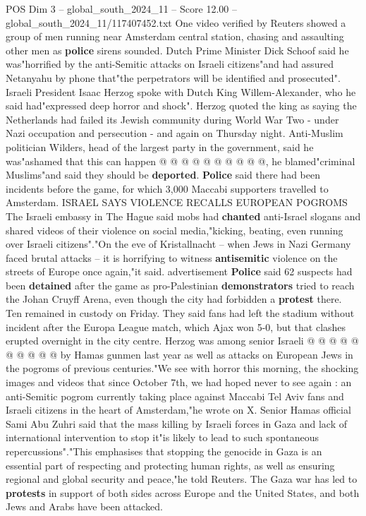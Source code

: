 \begin{textsample}{POS Dim 3 – global\_south\_2024\_11 – Score 12.00 – global\_south\_2024\_11/117407452.txt}
One video verified by Reuters showed a group of men running near Amsterdam central station, chasing and assaulting other men as \textbf{police} sirens sounded.
Dutch Prime Minister Dick Schoof said he was"horrified by the anti-Semitic attacks on Israeli citizens"and had assured Netanyahu by phone that"the perpetrators will be identified and prosecuted".
Israeli President Isaac Herzog spoke with Dutch King Willem-Alexander, who he said had"expressed deep horror and shock".
Herzog quoted the king as saying the Netherlands had failed its Jewish community during World War Two - under Nazi occupation and persecution - and again on Thursday night.
Anti-Muslim politician Wilders, head of the largest party in the government, said he was"ashamed that this can happen @ @ @ @ @ @ @ @ @ @, he blamed"criminal Muslims"and said they should be \textbf{deported}. \textbf{Police} said there had been incidents before the game, for which 3,000 Maccabi supporters travelled to Amsterdam.
ISRAEL SAYS VIOLENCE RECALLS EUROPEAN POGROMS The Israeli embassy in The Hague said mobs had \textbf{chanted} anti-Israel slogans and shared videos of their violence on social media,"kicking, beating, even running over Israeli citizens"."On the eve of Kristallnacht -- when Jews in Nazi Germany faced brutal attacks -- it is horrifying to witness \textbf{antisemitic} violence on the streets of Europe once again,"it said. advertisement \textbf{Police} said 62 suspects had been \textbf{detained} after the game as pro-Palestinian \textbf{demonstrators} tried to reach the Johan Cruyff Arena, even though the city had forbidden a \textbf{protest} there.
Ten remained in custody on Friday.
They said fans had left the stadium without incident after the Europa League match, which Ajax won 5-0, but that clashes erupted overnight in the city centre.
Herzog was among senior Israeli @ @ @ @ @ @ @ @ @ @ by Hamas gunmen last year as well as attacks on European Jews in the pogroms of previous centuries."We see with horror this morning, the shocking images and videos that since October 7th, we had hoped never to see again : an anti-Semitic pogrom currently taking place against Maccabi Tel Aviv fans and Israeli citizens in the heart of Amsterdam,"he wrote on X.
Senior Hamas official Sami Abu Zuhri said that the mass killing by Israeli forces in Gaza and lack of international intervention to stop it"is likely to lead to such spontaneous repercussions"."This emphasises that stopping the genocide in Gaza is an essential part of respecting and protecting human rights, as well as ensuring regional and global security and peace,"he told Reuters.
The Gaza war has led to \textbf{protests} in support of both sides across Europe and the United States, and both Jews and Arabs have been attacked.

\end{textsample}
